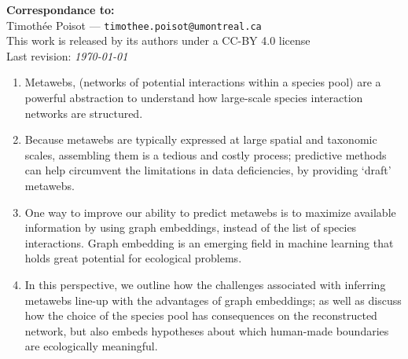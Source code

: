 \documentclass[11pt]{article}
\begin{document}
\textbf{Correspondance to:}\\
Timothée Poisot --- \texttt{timothee.poisot@umontreal.ca}\\

\vfill
This work is released by its authors under a CC-BY 4.0 license\hfill\ccby\\
Last revision: \emph{\today}

\clearpage
\thispagestyle{empty}

\vfill

\begin{enumerate}
    \item Metawebs, (networks of potential interactions within a species
pool) are a powerful abstraction to understand how large-scale species
interaction networks are structured.%
    \item Because metawebs are typically expressed at large spatial and
taxonomic scales, assembling them is a tedious and costly process;
predictive methods can help circumvent the limitations in data
deficiencies, by providing `draft' metawebs.%
    \item One way to improve our ability to predict metawebs is to
maximize available information by using graph embeddings, instead of the
list of species interactions. Graph embedding is an emerging field in
machine learning that holds great potential for ecological problems.%
    \item In this perspective, we outline how the challenges associated
with inferring metawebs line-up with the advantages of graph embeddings;
as well as discuss how the choice of the species pool has consequences
on the reconstructed network, but also embeds hypotheses about which
human-made boundaries are ecologically meaningful.%
\end{enumerate}


\vfill

\clearpage
\linenumbers
\pagestyle{normal}
\end{document}
